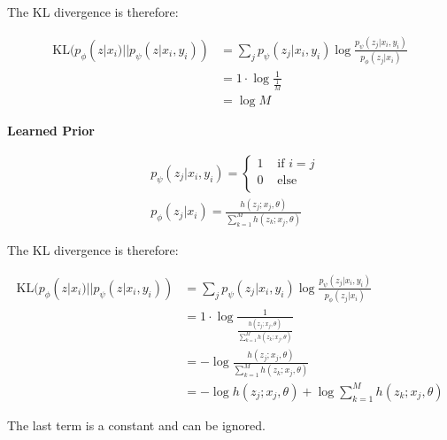 \documentclass{article}
\begin{document}
The KL divergence is therefore:

\begin{align}
\mbox{KL}(p_\phi(z | x_i) || p_\psi(z | x_i, y_i)) &= \sum_j p_\psi(z_j | x_i, y_i) \log \frac{p_\psi(z_j | x_i, y_i)}{p_\phi(z_j | x_i)} \\
&= 1 \cdot \log \frac{1}{\frac{1}{M}} \\
&= \log M
\end{align}

\textbf{Learned Prior}

\begin{align}
  &p_\psi(z_j | x_i, y_i) =
  \begin{cases}
    1 & \mbox{ if } i = j \\
    0 & \mbox{ else } \\
  \end{cases} \\
  &p_\phi(z_j | x_i) = \frac{h(z_j; x_j, \theta)}{\sum_{k=1}^M h(z_k; x_j, \theta)}
\end{align}

The KL divergence is therefore:

\begin{align}
\mbox{KL}(p_\phi(z | x_i) || p_\psi(z | x_i, y_i)) &= \sum_j p_\psi(z_j | x_i, y_i) \log \frac{p_\psi(z_j | x_i, y_i)}{p_\phi(z_j | x_i)} \\
&= 1 \cdot \log \frac{1}{\frac{h(z_j; x_j, \theta)}{\sum_{k=1}^M h(z_k; x_j, \theta)}} \\
&= - \log \frac{h(z_j; x_j, \theta)}{\sum_{k=1}^M h(z_k; x_j, \theta)} \\
&= - \log h(z_j; x_j, \theta) + \log \sum_{k=1}^M h(z_k; x_j, \theta)
\end{align}

The last term is a constant and can be ignored.

%




%
%
\end{document}
